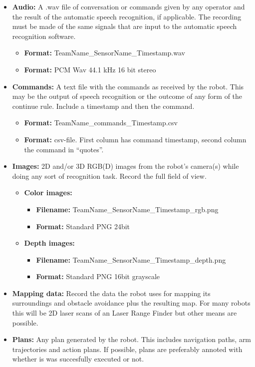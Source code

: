     \begin{itemize}
    \item \textbf{Audio: } A .wav file of conversation or commands given by any operator and the result of the automatic speech recognition, if applicable.
      The recording must be made of the same signals that are input to the automatic speech recognition software. 
      \begin{itemize}
	\item \textbf{Format: } TeamName\_SensorName\_Timestamp.wav
	\item \textbf{Format: } PCM Wav 44.1 kHz 16 bit stereo
      \end{itemize}
      
    \item \textbf{Commands: } A text file with the commands as received by the robot. 
      This may be the output of speech recognition or the outcome of any form of the continue rule.
      Include a timestamp and then the command. 
      \begin{itemize}
	\item \textbf{Format: } TeamName\_commands\_Timestamp.csv
	\item \textbf{Format: } csv-file. First column has command timestamp, second column the command in ``quotes''.
      \end{itemize}
    
    \item \textbf{Images: } 2D and/or 3D RGB(D) images from the robot's camera(s) while doing any sort of recognition task.
			    Record the full field of view. 
    \begin{itemize}
      \item
	\textbf{Color images: } 
	\begin{itemize}
	  \item \textbf{Filename: } TeamName\_SensorName\_Timestamp\_rgb.png
	  \item \textbf{Format: } Standard PNG 24bit
	\end{itemize}
      \item
	\textbf{Depth images: } 
	\begin{itemize}
	  \item \textbf{Filename: } TeamName\_SensorName\_Timestamp\_depth.png
	  \item \textbf{Format: } Standard PNG 16bit grayscale
	\end{itemize}
    \end{itemize}
    
    \item \textbf{Mapping data: } Record the data the robot uses for mapping its surroundings and obstacle avoidance plus the resulting map. 
      For many robots this will be 2D laser scans of an Laser Range Finder but other means are possible. 
    
    \item \textbf{Plans: } Any plan generated by the robot. This includes navigation paths, arm trajectories and action plans. 
      If possible, plans are preferably annoted with whether is was succesfully executed or not.
    \end{itemize}
    
